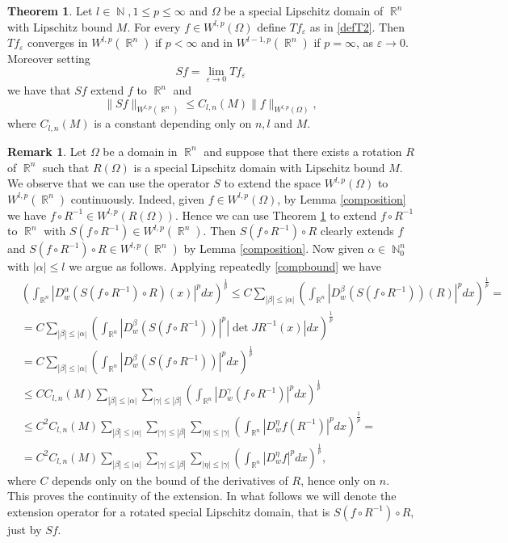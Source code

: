 \documentclass[12pt]{article}
\theoremstyle{definition}
\newtheorem{remark}{Remark}
\newtheorem{theorem}{Theorem}
\DeclareMathOperator\rr{\mathbb{R}}
\DeclareMathOperator\nn{\mathbb{N}}
\begin{document}
\begin{theorem}\label{Sdef}
Let $l \in \nn,1\le p \le \infty$ and $\Omega$ be a special Lipschitz domain of $\rr^n$ with Lipschitz bound $M$. For every $f \in W^{l,p}(\Omega)$ define $Tf_\varepsilon$ as in \eqref{defT2}. Then $Tf_\varepsilon $ converges in $W^{l,p}(\rr^n)$ if $p<\infty$ and in $W^{l-1,p}(\rr^n)$ if $p=\infty$, as $\varepsilon \to 0.$ Moreover setting
\[ Sf=\lim_{\varepsilon \to 0} Tf_\varepsilon\]
we have that $Sf$ extend $f$ to $\rr^n$ and 
\[ \| Sf\|_{W^{l,p}(\rr^n)} \le C_{l,n}(M) \| f\|_{W^{l,p}(\Omega) } ,\] 
where $C_{l,n}(M)$ is a constant depending only on $n,l$ and $M.$
\end{theorem}

\begin{remark}\label{rotlip}
Let $\Omega$ be a domain in $\rr^n$ and suppose that there exists a rotation $R$ of $\rr^n$ such that $R(\Omega)$ is a special Lipschitz domain with Lipschitz bound $M$. We observe that we can use the operator $S$ to extend the space $W^{l,p}(\Omega)$ to $W^{l,p}(\rr^n)$ continuously. Indeed, given $f \in W^{l,p}(\Omega)$, by Lemma \ref{composition} we have $f\circ R^{-1} \in W^{l,p}(R(\Omega))$. Hence we can use Theorem \ref{Sdef} to extend  $f\circ R^{-1}$ to $\rr^n$ with $S(f\circ R^{-1})\in W^{l,p}(\rr^n).$ Then $S(f\circ R^{-1})\circ R$ clearly extends $f$ and $S(f\circ R^{-1})\circ R \in W^{l,p}(\rr^n)$ by Lemma \ref{composition}. Now given $\alpha \in \nn^n_0$ with $|\alpha|\le l$ we argue as follows. Applying repeatedly \eqref{compbound} we have
\begin{align*}
&\left( \int_{\rr^n} |D^\alpha_w(S(f\circ R^{-1})\circ R)(x)|^pdx \right)^\frac{1}{p} \le C \sum_{|\beta|\le |\alpha|} \left( \int_{\rr^n} |D^\beta_w(S(f\circ R^{-1}))(R)|^p dx\right)^\frac{1}{p}=\\
&= C \sum_{|\beta|\le |\alpha|} \left( \int_{\rr^n} |D^\beta_w(S(f\circ R^{-1}))|^p |\det JR^{-1}(x)| dx\right)^\frac{1}{p}\\
&= C \sum_{|\beta|\le |\alpha|} \left( \int_{\rr^n} |D^\beta_w(S(f\circ R^{-1}))|^p  dx\right)^\frac{1}{p} \\
&\le CC_{l,n}(M)  \sum_{|\beta|\le |\alpha|} \sum_{|\gamma|\le |\beta|}\left( \int_{\rr^n} |D^\gamma_w(f\circ R^{-1})|^p  dx\right)^\frac{1}{p}\\
&\le C^2C_{l,n}(M)  \sum_{|\beta|\le |\alpha|} \sum_{|\gamma|\le |\beta|} \sum_{|\eta|\le |\gamma|}\left( \int_{\rr^n} |D^\eta_wf(R^{-1})|^p  dx\right)^\frac{1}{p}=\\
&= C^2C_{l,n}(M)  \sum_{|\beta|\le |\alpha|} \sum_{|\gamma|\le |\beta|} \sum_{|\eta|\le |\gamma|}\left( \int_{\rr^n} |D^\eta_w f|^p  dx\right)^\frac{1}{p},
\end{align*}
where $C$ depends only on the bound of the derivatives of $R$, hence only on $n$. This proves the continuity of the extension. In what follows we will denote the extension operator for a rotated special Lipschitz domain, that is $S(f\circ R^{-1})\circ R$, just by $Sf$.
\end{remark}
\end{document}
